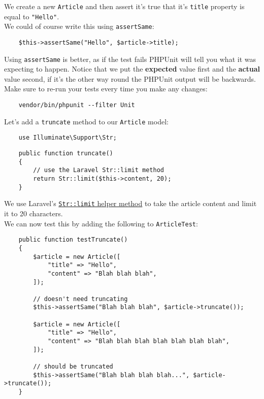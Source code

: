 We create a new \texttt{Article} and then assert it's true that it's \texttt{title} property is equal to \texttt{"Hello"}.
\\

We could of course write this using \texttt{assertSame}:

\begin{verbatim}
    $this->assertSame("Hello", $article->title);
\end{verbatim}

Using \texttt{assertSame} is better, as if the test fails PHPUnit will tell you what it was expecting to happen. Notice that we put the \textbf{expected} value first and the \textbf{actual} value second, if it's the other way round the PHPUnit output will be backwards.
\\

Make sure to re-run your tests every time you make any changes:

\begin{verbatim}
    vendor/bin/phpunit --filter Unit
\end{verbatim}

Let's add a \texttt{truncate} method to our \texttt{Article} model:

\begin{verbatim}
    use Illuminate\Support\Str;
\end{verbatim}

\begin{verbatim}
    public function truncate()
    {
        // use the Laravel Str::limit method
        return Str::limit($this->content, 20);
    }
\end{verbatim}

We use Laravel's \href{http://laravel.com/docs/6.x/helpers#method-str-limit}{\texttt{Str::limit} helper method} to take the article content and limit it to 20 characters.
\\

We can now test this by adding the following to \texttt{ArticleTest}:

\begin{verbatim}
    public function testTruncate()
    {
        $article = new Article([
            "title" => "Hello",
            "content" => "Blah blah blah",
        ]);

        // doesn't need truncating
        $this->assertSame("Blah blah blah", $article->truncate());

        $article = new Article([
            "title" => "Hello",
            "content" => "Blah blah blah blah blah blah blah",
        ]);

        // should be truncated
        $this->assertSame("Blah blah blah blah...", $article->truncate());
    }
\end{verbatim}


